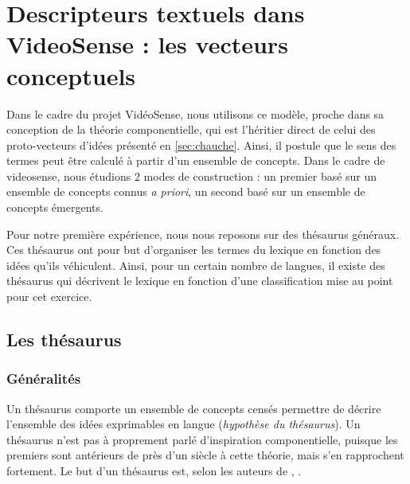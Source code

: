 
\section{Descripteurs textuels dans VideoSense : les vecteurs conceptuels} \label{sec:vectconcept}

Dans le cadre du projet VidéoSense, nous utilisons ce modèle, proche dans sa
conception de la théorie componentielle, qui est l'héritier direct de
celui des proto-vecteurs d'idées présenté en \ref{sec:chauche}. Ainsi,
il postule que le sens des termes peut être calculé à partir d'un
ensemble de concepts. Dans le cadre de videosense, nous étudions 2 modes de construction : un premier basé sur un ensemble de concepts connus \textit{a priori}, un second basé sur un ensemble de concepts émergents.

Pour notre première expérience, nous
nous reposons sur des thésaurus généraux. Ces thésaurus ont
pour but d'organiser les termes du lexique en fonction des idées
qu'ils véhiculent. Ainsi, pour un certain nombre de langues, il existe
des thésaurus qui décrivent le lexique en fonction d'une
classification mise au point pour cet exercice.

\subsection{Les thésaurus}
\label{sec:thes-larousse}

\subsubsection{Généralités}

Un thésaurus comporte un ensemble de concepts censés permettre de
décrire l'ensemble des idées exprimables en langue (\emph{hypothèse du
  thésaurus}). Un thésaurus n'est pas à proprement parlé d'inspiration
componentielle, puisque les premiers sont antérieurs de près d'un
siècle à cette théorie, mais s'en rapprochent fortement.  Le but d'un
thésaurus est, selon les auteurs de \cite{Thesaurus1992},
.

